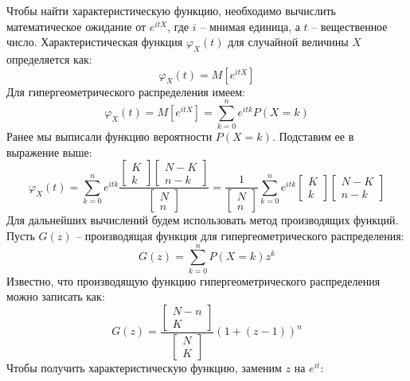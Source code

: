 \documentclass[a4paper, 12pt]{article}
\begin{document}
    Чтобы найти характеристическую функцию, необходимо вычислить математическое ожидание от $e^{itX}$,
    где $i$ -- мнимая единица, а $t$ -- вещественное число.
    Характеристическая функция $\varphi_X(t)$ для случайной величины $X$ определяется как:
    $$
    \varphi_X(t)=M\left[e^{itX}\right]
    $$
    Для гипергеометрического распределения имеем:
    $$
    \varphi_X(t)=M\left[e^{itX}\right]=\sum\limits_{k=0}^{n}e^{itk}P(X=k)
    $$
    Ранее мы выписали функцию вероятности $P(X=k)$. Подставим ее в выражение выше:
    $$
    \varphi_X(t)=\sum\limits_{k=0}^{n}e^{itk}\dfrac{
        \begin{bmatrix}
            K\\
            k
        \end{bmatrix}
        \begin{bmatrix}
            N-K\\
            n-k
        \end{bmatrix}
    }{
        \begin{bmatrix}
            N\\
            n
        \end{bmatrix}
    }
    =\dfrac{1}{
        \begin{bmatrix}
            N\\
            n
        \end{bmatrix}
    }
    \sum\limits_{k=0}^{n}e^{itk}
    \begin{bmatrix}
        K\\
        k
    \end{bmatrix}
    \begin{bmatrix}
        N-K\\
        n-k
    \end{bmatrix}
    $$
    Для дальнейших вычислений будем использовать метод производящих функций. Пусть $G(z)$
    -- производящая функция для гипергеометрического распределения:
    $$
    G(z)=\sum\limits_{k=0}^{n}P(X=k)z^k
    $$
    Известно, что производящую функцию гипергеометрического распределения можно записать как:
    $$
    G(z)=\dfrac{
        \begin{bmatrix}
            N-n\\
            K
        \end{bmatrix}
    }{
        \begin{bmatrix}
            N\\
            K
        \end{bmatrix}
    }
    (1+(z-1))^n
    $$
    Чтобы получить характеристическую функцию, заменим $z$ на $e^{it}$:
\end{document}
